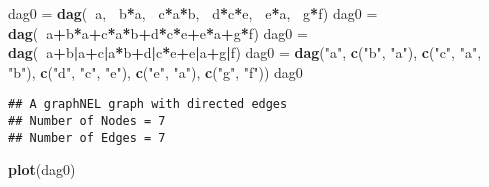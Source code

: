 \documentclass[]{article}
\newenvironment{Shaded}{\begin{snugshade}}{\end{snugshade}}
\newcommand{\KeywordTok}[1]{\textcolor[rgb]{0.13,0.29,0.53}{\textbf{#1}}}
\newcommand{\StringTok}[1]{\textcolor[rgb]{0.31,0.60,0.02}{#1}}
\newcommand{\OperatorTok}[1]{\textcolor[rgb]{0.81,0.36,0.00}{\textbf{#1}}}
\newcommand{\NormalTok}[1]{#1}
\begin{document}
\begin{Shaded}
\begin{Highlighting}[]
\NormalTok{dag0 =}\StringTok{ }\KeywordTok{dag}\NormalTok{(}\OperatorTok{~}\NormalTok{a, }\OperatorTok{~}\NormalTok{b}\OperatorTok{*}\NormalTok{a, }\OperatorTok{~}\NormalTok{c}\OperatorTok{*}\NormalTok{a}\OperatorTok{*}\NormalTok{b, }\OperatorTok{~}\NormalTok{d}\OperatorTok{*}\NormalTok{c}\OperatorTok{*}\NormalTok{e, }\OperatorTok{~}\NormalTok{e}\OperatorTok{*}\NormalTok{a, }\OperatorTok{~}\NormalTok{g}\OperatorTok{*}\NormalTok{f)}
\NormalTok{dag0 =}\StringTok{ }\KeywordTok{dag}\NormalTok{(}\OperatorTok{~}\NormalTok{a}\OperatorTok{+}\NormalTok{b}\OperatorTok{*}\NormalTok{a}\OperatorTok{+}\NormalTok{c}\OperatorTok{*}\NormalTok{a}\OperatorTok{*}\NormalTok{b}\OperatorTok{+}\NormalTok{d}\OperatorTok{*}\NormalTok{c}\OperatorTok{*}\NormalTok{e}\OperatorTok{+}\NormalTok{e}\OperatorTok{*}\NormalTok{a}\OperatorTok{+}\NormalTok{g}\OperatorTok{*}\NormalTok{f)}
\NormalTok{dag0 =}\StringTok{ }\KeywordTok{dag}\NormalTok{(}\OperatorTok{~}\NormalTok{a}\OperatorTok{+}\NormalTok{b}\OperatorTok{|}\NormalTok{a}\OperatorTok{+}\NormalTok{c}\OperatorTok{|}\NormalTok{a}\OperatorTok{*}\NormalTok{b}\OperatorTok{+}\NormalTok{d}\OperatorTok{|}\NormalTok{c}\OperatorTok{*}\NormalTok{e}\OperatorTok{+}\NormalTok{e}\OperatorTok{|}\NormalTok{a}\OperatorTok{+}\NormalTok{g}\OperatorTok{|}\NormalTok{f)}
\NormalTok{dag0 =}\StringTok{ }\KeywordTok{dag}\NormalTok{(}\StringTok{"a"}\NormalTok{, }\KeywordTok{c}\NormalTok{(}\StringTok{"b"}\NormalTok{, }\StringTok{"a"}\NormalTok{), }\KeywordTok{c}\NormalTok{(}\StringTok{"c"}\NormalTok{, }\StringTok{"a"}\NormalTok{, }\StringTok{"b"}\NormalTok{), }\KeywordTok{c}\NormalTok{(}\StringTok{"d"}\NormalTok{, }\StringTok{"c"}\NormalTok{, }\StringTok{"e"}\NormalTok{), }\KeywordTok{c}\NormalTok{(}\StringTok{"e"}\NormalTok{, }\StringTok{"a"}\NormalTok{), }\KeywordTok{c}\NormalTok{(}\StringTok{"g"}\NormalTok{, }\StringTok{"f"}\NormalTok{))}
\NormalTok{dag0}
\end{Highlighting}
\end{Shaded}

\begin{verbatim}
## A graphNEL graph with directed edges
## Number of Nodes = 7 
## Number of Edges = 7
\end{verbatim}

\begin{Shaded}
\begin{Highlighting}[]
\KeywordTok{plot}\NormalTok{(dag0)}
\end{Highlighting}
\end{Shaded}
\end{document}

